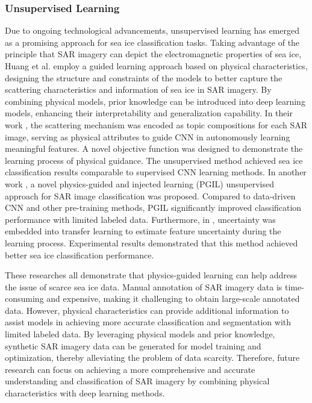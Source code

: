 \subsubsection {Unsupervised Learning}
Due to ongoing technological advancements, unsupervised learning has emerged as a promising approach for sea ice classification tasks. Taking advantage of the principle that SAR imagery can depict the electromagnetic properties of sea ice, Huang et al. employ a guided learning approach based on physical characteristics, designing the structure and constraints of the models to better capture the scattering characteristics and information of sea ice in SAR imagery. By combining physical models, prior knowledge can be introduced into deep learning models, enhancing their interpretability and generalization capability. In their work \cite{125huang2021physics}, the scattering mechanism was encoded as topic compositions for each SAR image, serving as physical attributes to guide CNN in autonomously learning meaningful features. A novel objective function was designed to demonstrate the learning process of physical guidance. The unsupervised method achieved sea ice classification results comparable to supervised CNN learning methods. In another work \cite{126huang2022physically}, a novel physics-guided and injected learning (PGIL) unsupervised approach for SAR image classification was proposed. Compared to data-driven CNN and other pre-training methods, PGIL significantly improved classification performance with limited labeled data. Furthermore, in \cite{127liu2022aleatoric}, uncertainty was embedded into transfer learning to estimate feature uncertainty during the learning process. Experimental results demonstrated that this method achieved better sea ice classification performance.

These researches all demonstrate that physics-guided learning can help address the issue of scarce sea ice data. Manual annotation of SAR imagery data is time-consuming and expensive, making it challenging to obtain large-scale annotated data. However, physical characteristics can provide additional information to assist models in achieving more accurate classification and segmentation with limited labeled data. By leveraging physical models and prior knowledge, synthetic SAR imagery data can be generated for model training and optimization, thereby alleviating the problem of data scarcity. Therefore, future research can focus on achieving a more comprehensive and accurate understanding and classification of SAR imagery by combining physical characteristics with deep learning methods.



